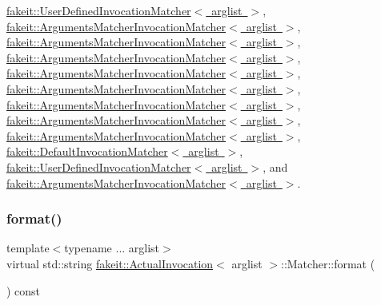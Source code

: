 \mbox{\hyperlink{structfakeit_1_1UserDefinedInvocationMatcher_a8090f8ab0af9c775f833e725f4414368}{fakeit\+::\+User\+Defined\+Invocation\+Matcher$<$ arglist $>$}}, \mbox{\hyperlink{structfakeit_1_1ArgumentsMatcherInvocationMatcher_a5174a0a696bbbc3090b4b1d7937c02f9}{fakeit\+::\+Arguments\+Matcher\+Invocation\+Matcher$<$ arglist $>$}}, \mbox{\hyperlink{structfakeit_1_1ArgumentsMatcherInvocationMatcher_a5174a0a696bbbc3090b4b1d7937c02f9}{fakeit\+::\+Arguments\+Matcher\+Invocation\+Matcher$<$ arglist $>$}}, \mbox{\hyperlink{structfakeit_1_1ArgumentsMatcherInvocationMatcher_a5174a0a696bbbc3090b4b1d7937c02f9}{fakeit\+::\+Arguments\+Matcher\+Invocation\+Matcher$<$ arglist $>$}}, \mbox{\hyperlink{structfakeit_1_1ArgumentsMatcherInvocationMatcher_a5174a0a696bbbc3090b4b1d7937c02f9}{fakeit\+::\+Arguments\+Matcher\+Invocation\+Matcher$<$ arglist $>$}}, \mbox{\hyperlink{structfakeit_1_1ArgumentsMatcherInvocationMatcher_a5174a0a696bbbc3090b4b1d7937c02f9}{fakeit\+::\+Arguments\+Matcher\+Invocation\+Matcher$<$ arglist $>$}}, \mbox{\hyperlink{structfakeit_1_1ArgumentsMatcherInvocationMatcher_a5174a0a696bbbc3090b4b1d7937c02f9}{fakeit\+::\+Arguments\+Matcher\+Invocation\+Matcher$<$ arglist $>$}}, \mbox{\hyperlink{structfakeit_1_1ArgumentsMatcherInvocationMatcher_a5174a0a696bbbc3090b4b1d7937c02f9}{fakeit\+::\+Arguments\+Matcher\+Invocation\+Matcher$<$ arglist $>$}}, \mbox{\hyperlink{structfakeit_1_1ArgumentsMatcherInvocationMatcher_a5174a0a696bbbc3090b4b1d7937c02f9}{fakeit\+::\+Arguments\+Matcher\+Invocation\+Matcher$<$ arglist $>$}}, \mbox{\hyperlink{structfakeit_1_1DefaultInvocationMatcher_a056fc7516e51e5eb15831359cb376fef}{fakeit\+::\+Default\+Invocation\+Matcher$<$ arglist $>$}}, \mbox{\hyperlink{structfakeit_1_1UserDefinedInvocationMatcher_a8090f8ab0af9c775f833e725f4414368}{fakeit\+::\+User\+Defined\+Invocation\+Matcher$<$ arglist $>$}}, and \mbox{\hyperlink{structfakeit_1_1ArgumentsMatcherInvocationMatcher_a5174a0a696bbbc3090b4b1d7937c02f9}{fakeit\+::\+Arguments\+Matcher\+Invocation\+Matcher$<$ arglist $>$}}.

\mbox{\label{structfakeit_1_1ActualInvocation_1_1Matcher_ae19e50f7b3a2cd2a9d6670acbaa47c32}} 
\subsubsection{\texorpdfstring{format()}{format()}\hspace{0.1cm}{\footnotesize\ttfamily [2/9]}}
{\footnotesize\ttfamily template$<$typename ... arglist$>$ \\
virtual std\+::string \mbox{\hyperlink{structfakeit_1_1ActualInvocation}{fakeit\+::\+Actual\+Invocation}}$<$ arglist $>$\+::Matcher\+::format (\begin{DoxyParamCaption}{ }\end{DoxyParamCaption}) const\hspace{0.3cm}{\ttfamily [pure virtual]}}



